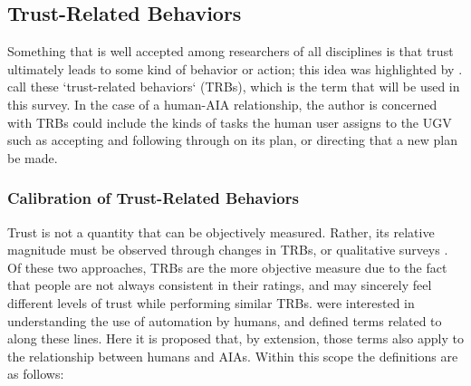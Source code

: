 \subsection{Trust-Related Behaviors} \label{sec:trbs}
Something that is well accepted among researchers of all disciplines is that trust ultimately leads to some kind of behavior or action; this idea was highlighted by \citet{Lewis1985-pr}.  \citet{McKnight2001-fa} call these `trust-related behaviors` (TRBs), which is the term that will be used in this survey. In the case of a human-AIA relationship, the author is concerned with TRBs could include the kinds of tasks the human user assigns to the UGV such as accepting and following through on its plan, or directing that a new plan be made.

\subsubsection{Calibration of Trust-Related Behaviors}
    Trust is not a quantity that can be objectively measured. Rather, its relative magnitude must be observed through changes in TRBs, or qualitative surveys \cite{Muir1996-gt}. Of these two approaches, TRBs are the more objective measure due to the fact that people are not always consistent in their ratings, and may sincerely feel different levels of trust while performing similar TRBs. \citet{Parasuraman1997-co} were interested in understanding the use of automation by humans, and defined terms related to  along these lines. Here it is proposed that, by extension, those terms also apply to the relationship between humans and AIAs. Within this scope the definitions are as follows:%
    
